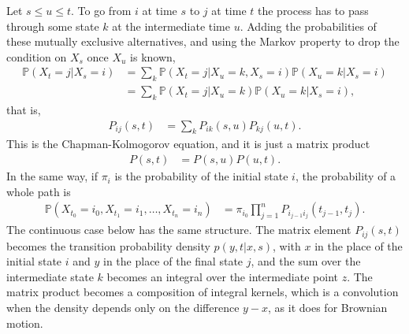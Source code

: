 \documentclass[11pt]{article}
\begin{document}
Let $s\leq u\leq t$. To go from $i$ at time $s$ to $j$ at time $t$ the process has to pass through some state $k$ at the intermediate time $u$. Adding the probabilities of these mutually exclusive alternatives, and using the Markov property to drop the condition on $X_s$ once $X_u$ is known,
\begin{align}
  \mathbb{P}(X_t=j|X_s=i)&=\sum_k\mathbb{P}(X_t=j|X_u=k,X_s=i)\mathbb{P}(X_u=k|X_s=i)\nonumber\\
  &=\sum_k\mathbb{P}(X_t=j|X_u=k)\mathbb{P}(X_u=k|X_s=i),
\end{align}
that is,
\begin{align}
  P_{ij}(s,t)&=\sum_kP_{ik}(s,u)P_{kj}(u,t).
\end{align}
This is the Chapman-Kolmogorov equation, and it is just a matrix product
\begin{align}
  P(s,t)&=P(s,u)P(u,t).
\end{align}
In the same way, if $\pi_i$ is the probability of the initial state $i$, the probability of a whole path is
\begin{align}
  \mathbb{P}(X_{t_0}=i_0,X_{t_1}=i_1,\dots,X_{t_n}=i_n)&=\pi_{i_0}\prod_{j=1}^nP_{i_{j-1}i_j}(t_{j-1},t_j).
\end{align}
The continuous case below has the same structure. The matrix element $P_{ij}(s,t)$ becomes the transition probability density $p(y,t|x,s)$, with $x$ in the place of the initial state $i$ and $y$ in the place of the final state $j$, and the sum over the intermediate state $k$ becomes an integral over the intermediate point $z$. The matrix product becomes a composition of integral kernels, which is a convolution when the density depends only on the difference $y-x$, as it does for Brownian motion.
\end{document}
